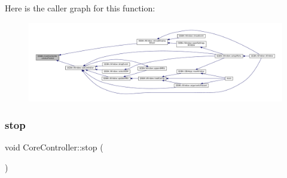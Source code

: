 Here is the caller graph for this function\+:
\nopagebreak
\begin{figure}[H]
\begin{center}
\leavevmode
\includegraphics[width=350pt]{class_q_g_b_a_1_1_core_controller_a5f2f7c60e587d7a983654898d80802e0_icgraph}
\end{center}
\end{figure}
\mbox{\label{class_q_g_b_a_1_1_core_controller_a4c9b7742e703ce7377b3176446f43813}} 
\subsubsection{\texorpdfstring{stop}{stop}}
{\footnotesize\ttfamily void Core\+Controller\+::stop (\begin{DoxyParamCaption}{ }\end{DoxyParamCaption})\hspace{0.3cm}{\ttfamily [slot]}}

